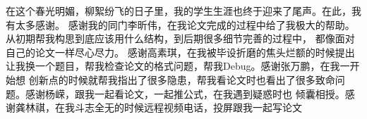 \begin{thanks}
    在这个春光明媚，柳絮纷飞的日子里，我的学生生涯也终于迎来了尾声。在此，我有太多感谢。
    感谢我的同门李昕伟，在我论文完成的过程中给了我极大的帮助。从初期帮我构思到底应该用什么结构，到后期很多细节完善的过程中，
    都像面对自己的论文一样尽心尽力。
    感谢高素琪，在我被毕设折磨的焦头烂额的时候提出让我换一个题目，帮我检查论文的格式问题，帮我Debug。感谢张万鹏，在我一开始想
    创新点的时候就帮我指出了很多隐患，帮我看论文时也看出了很多致命问题。感谢杨嵘，跟我一起看论文，一起推公式，在我遇到疑惑时也
    倾囊相授。感谢龚林祺，在我斗志全无的时候远程视频电话，投屏跟我一起写论文
\end{thanks} 

